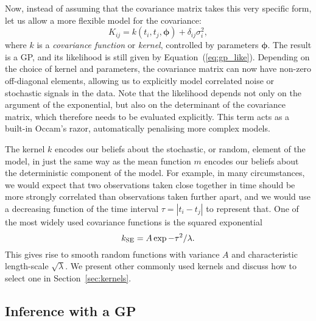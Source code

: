 \documentclass[letterpaper]{ar-1col}
\newcommand{\suz}[1]{\textcolor{magenta}{#1}}
\begin{document}
Now, instead of assuming that the covariance matrix takes this very specific form, let us allow a more flexible model for the covariance:
\begin{equation}
  K_{ij} = k(t_i,t_j,\boldsymbol{\phi}) + \delta_{ij} \sigma_i^2,
\end{equation}
where $k$ is a \emph{covariance function} or \emph{kernel}, controlled by parameters $\boldsymbol{\phi}$. The result is a GP, and its likelihood is still given by Equation~(\ref{eq:gp_like}). Depending on the choice of kernel and parameters, the covariance matrix can now have non-zero off-diagonal elements, allowing us to explicitly model correlated noise or stochastic signals in the data.
Note that the likelihood depends not only on the argument of the exponential, but also on the determinant of the covariance matrix, which therefore needs to be evaluated explicitly. This term acts as a built-in Occam's razor, automatically penalising more complex models.

The kernel $k$ encodes our beliefs about the stochastic, or random, element of the model, in just the same way as the mean function $m$ encodes our beliefs about the deterministic component of the model. For example, in many circumstances, we would expect that two observations taken close together in time should be more strongly correlated than observations taken further apart, and we would use a decreasing function of the time interval $\tau=|t_i-t_j|$ to represent that. One of the most widely used covariance functions is the squared exponential
\begin{equation}
    k_{\rm SE} = A \exp{-\tau^2/\lambda}.
\end{equation}
This gives rise to smooth random functions with variance $A$ and characteristic length-scale $\sqrt{\lambda}$. We present other commonly used kernels and discuss how to select one in Section~\ref{sec:kernels}.

\subsection{Inference with a GP}

\end{document}
